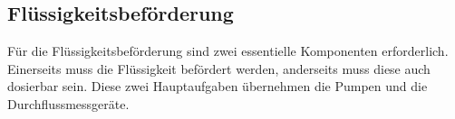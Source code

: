 \subsection{Flüssigkeitsbeförderung}
\label{subsec:Flüssigkeitsbeförderung}

Für die Flüssigkeitsbeförderung sind zwei essentielle Komponenten  erforderlich. Einerseits muss die Flüssigkeit befördert werden, anderseits muss diese auch dosierbar sein. Diese zwei Hauptaufgaben übernehmen die Pumpen und die Durchflussmessgeräte. 

